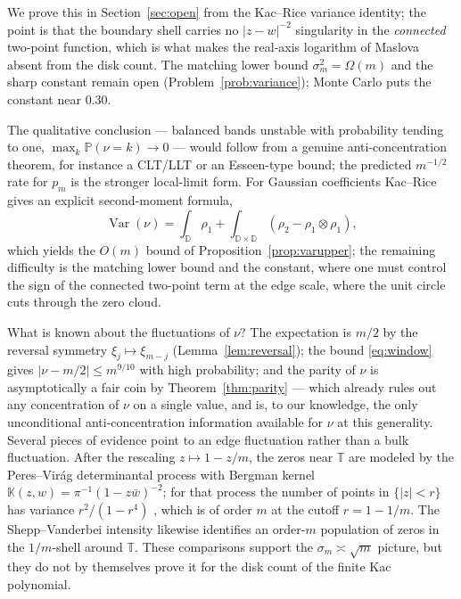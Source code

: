 \documentclass[11pt]{article}
\newcommand{\D}{\mathbb{D}}
\newcommand{\T}{\mathbb{T}}
\newcommand{\PP}{\mathbb{P}}
\begin{document}
We prove this in Section~\ref{sec:open} from the Kac--Rice variance identity; the
point is that the boundary shell carries no $|z-w|^{-2}$ singularity in the
\emph{connected} two-point function, which is what makes the real-axis logarithm
of Maslova absent from the disk count.  The matching lower bound
$\sigma_m^2=\Omega(m)$ and the sharp constant remain open
(Problem~\ref{prob:variance}); Monte Carlo puts the constant near $0.30$.

The qualitative conclusion --- balanced bands unstable with probability tending
to one, $\max_k\PP(\nu=k)\to0$ --- would follow from a genuine
anti-concentration theorem, for instance a CLT/LLT or an Esseen-type bound; the
predicted \(m^{-1/2}\) rate for \(p_m\) is the stronger local-limit form.  For
Gaussian coefficients Kac--Rice gives an explicit second-moment
formula,
\[
\operatorname{Var}(\nu)
=\int_{\D}\rho_1+
\int_{\D\times\D}(\rho_2-\rho_1\otimes\rho_1),
\]
which yields the $O(m)$ bound of Proposition~\ref{prop:varupper}; the remaining
difficulty is the matching lower bound and the constant, where one must control
the sign of the connected two-point term at the edge scale, where the unit circle
cuts through the zero cloud.

What is known about the fluctuations of $\nu$?  The expectation is $m/2$ by the
reversal symmetry $\xi_j\mapsto\xi_{m-j}$ (Lemma~\ref{lem:reversal}); the bound
\eqref{eq:window} gives $|\nu-m/2|\le m^{9/10}$ with high probability; and the
parity of $\nu$ is asymptotically a fair coin by Theorem~\ref{thm:parity} ---
which already rules out any concentration of $\nu$ on a single value, and is, to
our knowledge, the only unconditional anti-concentration information available
for $\nu$ at this generality.  Several pieces of evidence point to an edge
fluctuation rather than a bulk fluctuation.  After the rescaling
$z\mapsto1-z/m$, the zeros near \(\T\) are modeled by the Peres--Vir\'ag
determinantal process \cite{PV,HKPV} with Bergman kernel
$\mathbb K(z,w)=\pi^{-1}(1-z\bar w)^{-2}$; for that process the number of points
in $\{|z|<r\}$ has variance $r^2/(1-r^4)$ \cite{Buckley}, which is of order \(m\)
at the cutoff \(r=1-1/m\).  The Shepp--Vanderbei intensity \cite{SV} likewise
identifies an order-\(m\) population of zeros in the \(1/m\)-shell around
\(\T\).  These comparisons support the \(\sigma_m\asymp\sqrt m\) picture, but
they do not by themselves prove it for the disk count of the finite Kac
polynomial.
\end{document}
